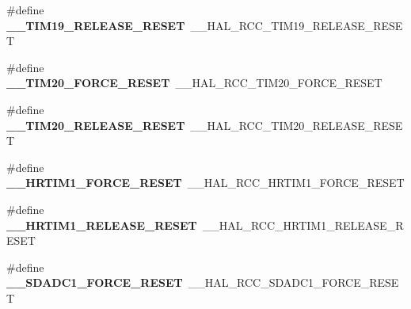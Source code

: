 \begin{DoxyCompactItemize}
\item 
\mbox{\label{group___h_a_l___r_c_c___aliased_ga16341f8a1420c4029215b0c89de8bda5}} 
\#define {\bfseries \+\_\+\+\_\+\+T\+I\+M19\+\_\+\+R\+E\+L\+E\+A\+S\+E\+\_\+\+R\+E\+S\+ET}~\+\_\+\+\_\+\+H\+A\+L\+\_\+\+R\+C\+C\+\_\+\+T\+I\+M19\+\_\+\+R\+E\+L\+E\+A\+S\+E\+\_\+\+R\+E\+S\+ET
\item 
\mbox{\label{group___h_a_l___r_c_c___aliased_gab06074cd313cdabefa42d60b6480abc1}} 
\#define {\bfseries \+\_\+\+\_\+\+T\+I\+M20\+\_\+\+F\+O\+R\+C\+E\+\_\+\+R\+E\+S\+ET}~\+\_\+\+\_\+\+H\+A\+L\+\_\+\+R\+C\+C\+\_\+\+T\+I\+M20\+\_\+\+F\+O\+R\+C\+E\+\_\+\+R\+E\+S\+ET
\item 
\mbox{\label{group___h_a_l___r_c_c___aliased_gabc15a945f5f92e4dff05caf959715131}} 
\#define {\bfseries \+\_\+\+\_\+\+T\+I\+M20\+\_\+\+R\+E\+L\+E\+A\+S\+E\+\_\+\+R\+E\+S\+ET}~\+\_\+\+\_\+\+H\+A\+L\+\_\+\+R\+C\+C\+\_\+\+T\+I\+M20\+\_\+\+R\+E\+L\+E\+A\+S\+E\+\_\+\+R\+E\+S\+ET
\item 
\mbox{\label{group___h_a_l___r_c_c___aliased_ga0ae3e0425993ce111901795d509024d6}} 
\#define {\bfseries \+\_\+\+\_\+\+H\+R\+T\+I\+M1\+\_\+\+F\+O\+R\+C\+E\+\_\+\+R\+E\+S\+ET}~\+\_\+\+\_\+\+H\+A\+L\+\_\+\+R\+C\+C\+\_\+\+H\+R\+T\+I\+M1\+\_\+\+F\+O\+R\+C\+E\+\_\+\+R\+E\+S\+ET
\item 
\mbox{\label{group___h_a_l___r_c_c___aliased_ga94826174a601c902e37f88bcee03059a}} 
\#define {\bfseries \+\_\+\+\_\+\+H\+R\+T\+I\+M1\+\_\+\+R\+E\+L\+E\+A\+S\+E\+\_\+\+R\+E\+S\+ET}~\+\_\+\+\_\+\+H\+A\+L\+\_\+\+R\+C\+C\+\_\+\+H\+R\+T\+I\+M1\+\_\+\+R\+E\+L\+E\+A\+S\+E\+\_\+\+R\+E\+S\+ET
\item 
\mbox{\label{group___h_a_l___r_c_c___aliased_ga4772f1a0159530556eafe5771e89396b}} 
\#define {\bfseries \+\_\+\+\_\+\+S\+D\+A\+D\+C1\+\_\+\+F\+O\+R\+C\+E\+\_\+\+R\+E\+S\+ET}~\+\_\+\+\_\+\+H\+A\+L\+\_\+\+R\+C\+C\+\_\+\+S\+D\+A\+D\+C1\+\_\+\+F\+O\+R\+C\+E\+\_\+\+R\+E\+S\+ET
\item 
\mbox{\label{group___h_a_l___r_c_c___aliased_ga8ac8bc6474aee01e71d62b035fbf6126}} 

\end{DoxyCompactItemize}
